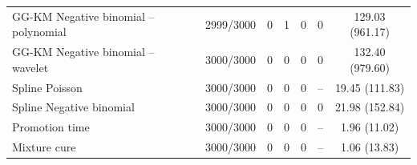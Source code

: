 \begin{table}[p]
{\begin{tabular}{lcccccc}
GG-KM Negative binomial -- polynomial & 2999/3000 & 0 & 1 & 0 & 0 & 129.03 (961.17) \\
GG-KM Negative binomial -- wavelet & 3000/3000 & 0 & 0 & 0 & 0 & 132.40 (979.60) \\
\hline
Spline Poisson & 3000/3000 & 0 & 0 & 0 & -- & 19.45 (111.83) \\
Spline Negative binomial & 3000/3000 & 0 & 0 & 0 & 0 & 21.98 (152.84) \\
Promotion time & 3000/3000 & 0 & 0 & 0 & -- & 1.96 (11.02) \\
Mixture cure & 3000/3000 & 0 & 0 & 0 & -- & 1.06 (13.83) \\
\hline
\end{tabular}%
}
\end{table}
